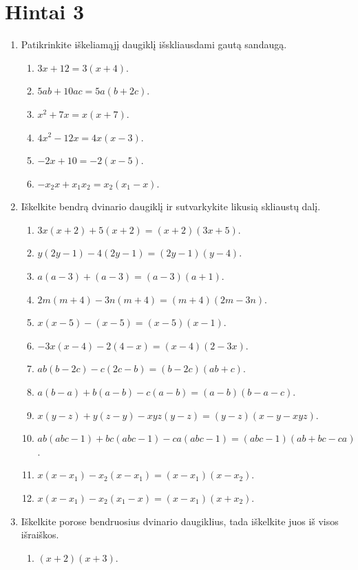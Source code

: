 \documentclass[11pt,a4paper]{scrartcl}
\begin{document}
\newpage
\section{Hintai 3}

\begin{enumerate}[label=\textbf{\arabic*.}, leftmargin=*]
    \item Patikrinkite iškeliamąjį daugiklį išskliausdami gautą sandaugą.
    \begin{enumerate}[label={(\arabic*)}]
        \item $3x+12=3(x+4)$.
        \item $5ab+10ac=5a(b+2c)$.
        \item $x^2+7x=x(x+7)$.
        \item $4x^2-12x=4x(x-3)$.
        \item $-2x+10=-2(x-5)$.
        \item $-x_2x+x_1x_2=x_2(x_1-x)$.
    \end{enumerate}
    \item Iškelkite bendrą dvinario daugiklį ir sutvarkykite likusią skliaustų dalį.
    \begin{enumerate}[label={(\arabic*)}]
        \item $3x(x+2)+5(x+2)=(x+2)(3x+5)$.
        \item $y(2y-1)-4(2y-1)=(2y-1)(y-4)$.
        \item $a(a-3)+(a-3)=(a-3)(a+1)$.
        \item $2m(m+4)-3n(m+4)=(m+4)(2m-3n)$.
        \item $x(x-5)-(x-5)=(x-5)(x-1)$.
        \item $-3x(x-4)-2(4-x)=(x-4)(2-3x)$.
        \item $ab(b-2c)-c(2c-b)=(b-2c)(ab+c)$.
        \item $a(b-a)+b(a-b)-c(a-b)=(a-b)(b-a-c)$.
        \item $x(y-z)+y(z-y)-xyz(y-z)=(y-z)(x-y-xyz)$.
        \item $ab(abc-1)+bc(abc-1)-ca(abc-1)=(abc-1)(ab+bc-ca)$.
        \item $x(x-x_1)-x_2(x-x_1)=(x-x_1)(x-x_2)$.
        \item $x(x-x_1)-x_2(x_1-x)=(x-x_1)(x+x_2)$.
    \end{enumerate}
    \item Iškelkite porose bendruosius dvinario daugiklius, tada iškelkite juos iš visos išraiškos.
    \begin{enumerate}[label={(\arabic*)}]
        \item $(x+2)(x+3)$.

\end{enumerate}
\end{enumerate}
\end{document}
